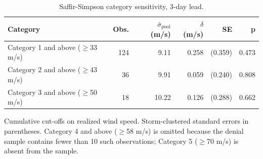 \begin{table}

\caption{Saffir-Simpson category sensitivity, 3-day lead. \label{tab:appB_intensity}}
\centering
\begin{threeparttable}
\begin{tabular}[t]{lrrrrr}
\toprule
Category & Obs. & $\bar{\sigma}_{\text{pool}}$ (m/s) & $\delta$ (m/s) & SE & p\\
\midrule
Category 1 and above ($\geq$33 m/s) & 124 & 9.11 & 0.258 & (0.359) & 0.473\\
Category 2 and above ($\geq$43 m/s) & 36 & 9.91 & 0.059 & (0.240) & 0.808\\
Category 3 and above ($\geq$50 m/s) & 18 & 10.22 & 0.126 & (0.288) & 0.662\\
\bottomrule
\end{tabular}
\begin{tablenotes}
\small
\item Cumulative cut-offs on realized wind speed. Storm-clustered standard errors in parentheses. Category 4 and above ($\geq$58 m/s) is omitted because the denial sample contains fewer than 10 such observations; Category 5 ($\geq$70 m/s) is absent from the sample.
\end{tablenotes}
\end{threeparttable}
\end{table}

